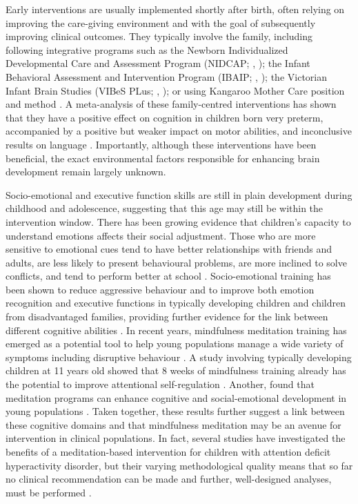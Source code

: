 Early interventions are usually implemented shortly after birth, often relying on improving the care-giving environment and with the goal of subsequently improving clinical outcomes. They typically involve the family, including following integrative programs such as the Newborn Individualized Developmental Care and Assessment Program (NIDCAP; \citeauthor{Peters2009}, \citeyear{Peters2009}); the Infant Behavioral Assessment and Intervention Program (IBAIP; \citeauthor{VanHus2016}, \citeyear{VanHus2016}); the Victorian Infant Brain Studies (VIBeS PLus; \citeauthor{Spittle2018}, \citeyear{Spittle2018}); or using Kangaroo Mother Care position and method \citep{Peters2009}. A meta-analysis of these family-centred interventions has shown that they have a positive effect on cognition in children born very preterm, accompanied by a positive but weaker impact on motor abilities, and inconclusive results on language \citep{Ferreira2020}. Importantly, although these interventions have been beneficial, the exact environmental factors responsible for enhancing brain development remain largely unknown. 

Socio-emotional and executive function skills are still in plain development during childhood and adolescence, suggesting that this age may still be within the intervention window. There has been growing evidence that children's capacity to understand emotions affects their social adjustment. Those who are more sensitive to emotional cues tend to have better relationships with friends and adults, are less likely to present behavioural problems, are more inclined to solve conflicts, and tend to perform better at school \citep{Denham2006,Domitrovich2007, Harrington2020}. Socio-emotional training has been shown to reduce aggressive behaviour and to improve both emotion recognition and executive functions in typically developing children and children from disadvantaged families, providing further evidence for the link between different cognitive abilities \citep{Pons2002,Sprung2015, Grazzani2018, DeMooij2020}. In recent years, mindfulness meditation training has emerged as a potential tool to help young populations manage a wide variety of symptoms including disruptive behaviour \citep{Perry-Parrish2016}. A study involving typically developing children at 11 years old showed that 8 weeks of mindfulness training already has the potential to improve attentional self-regulation \citep{Felver2017}. Another, found that meditation programs can enhance cognitive and social-emotional development in young populations \citep{Schonert-Reichl2015}. Taken together, these results further suggest a link between these cognitive domains and that mindfulness meditation may be an avenue for intervention in clinical populations. In fact, several studies have investigated the benefits of a meditation-based intervention for children with attention deficit hyperactivity disorder, but their varying methodological quality means that so far no clinical recommendation can be made and further, well-designed analyses, must be performed \citep{Evans2018}.

